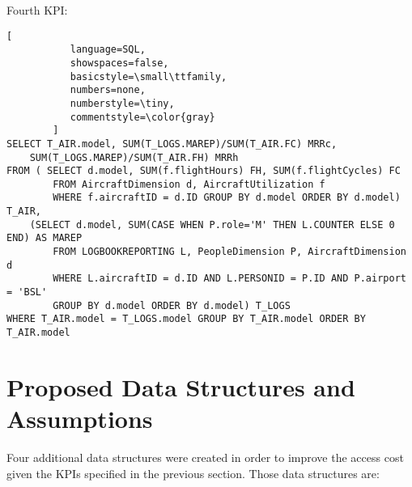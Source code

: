 \documentclass{article} %
\begin{document}
Fourth KPI:
\begin{lstlisting}[
           language=SQL,
           showspaces=false,
           basicstyle=\small\ttfamily,
           numbers=none,
           numberstyle=\tiny,
           commentstyle=\color{gray}
        ]
SELECT T_AIR.model, SUM(T_LOGS.MAREP)/SUM(T_AIR.FC) MRRc,
    SUM(T_LOGS.MAREP)/SUM(T_AIR.FH) MRRh
FROM ( SELECT d.model, SUM(f.flightHours) FH, SUM(f.flightCycles) FC
        FROM AircraftDimension d, AircraftUtilization f
        WHERE f.aircraftID = d.ID GROUP BY d.model ORDER BY d.model) T_AIR,
    (SELECT d.model, SUM(CASE WHEN P.role='M' THEN L.COUNTER ELSE 0 END) AS MAREP
        FROM LOGBOOKREPORTING L, PeopleDimension P, AircraftDimension d
        WHERE L.aircraftID = d.ID AND L.PERSONID = P.ID AND P.airport = 'BSL' 
        GROUP BY d.model ORDER BY d.model) T_LOGS
WHERE T_AIR.model = T_LOGS.model GROUP BY T_AIR.model ORDER BY T_AIR.model
\end{lstlisting}

\section{Proposed Data Structures and Assumptions}

Four additional data structures were created in order to improve the access cost given the KPIs specified in the previous section. Those data structures are:
\end{document}
